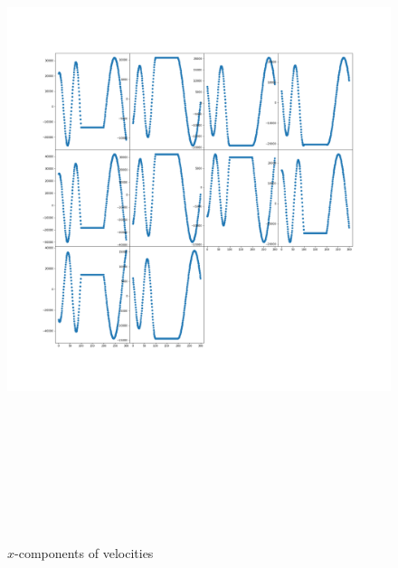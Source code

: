 \documentclass[12pt]{article}
\begin{document}
	\begin{figure}[H]
		\includegraphics[width=\linewidth, height=20cm]{subvsx3.png} \caption{$x$-components of velocities} \label{subvsx3}
	\end{figure}
\end{document}
